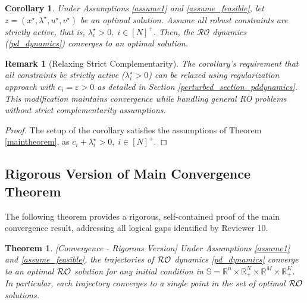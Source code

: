 \documentclass[journal,twoside,web]{ieeecolor}
\newcommand{\rev}[1]{\textcolor{revisionblue}{#1}}
\newcommand{\purpletext}[1]{\textcolor{proofpurple}{#1}}
\newtheorem{theorem}{Theorem}
\newtheorem{corollary}{Corollary}
\newtheorem{remark}{Remark}
\begin{document}
\begin{corollary}
Under Assumptions \ref{assume1} and \ref{assume_feasible}, let $z=(x^\star,\lambda^\star,u^\star,v^\star)$ be an optimal solution.
Assume all robust constraints are strictly active, that is, $\lambda_i^\star>0,\;i\in[N]^+$. Then, the $\mathcal{RO}$ dynamics (\ref{pd_dynamics}) converges to an optimal solution.
\end{corollary}

\begin{remark}[\rev{Relaxing Strict Complementarity}]
\rev{The corollary's requirement that all constraints be strictly active ($\lambda_i^\star > 0$) can be relaxed using
regularization approach with $c_i = \varepsilon > 0$ as detailed in Section \ref{perturbed_section_pddynamics}. This modification maintains convergence while handling general RO problems without strict complementarity assumptions.}
\end{remark}
\begin{proof}
The setup of the corollary satisfies the assumptions of Theorem \ref{maintheorem}, as $c_i+\lambda_i^\star>0,\;i\in[N]^+$.
\end{proof}

\newpage
\subsection*{\purpletext{Rigorous Version of Main Convergence Theorem}}

\purpletext{The following theorem provides a rigorous, self-contained proof of the main convergence result, addressing all logical gaps identified by Reviewer 10.}

\begin{theorem}\label{main_theorem_copy}[Convergence - Rigorous Version]
\rev{Under Assumptions \ref{assume1} and \ref{assume_feasible}, the trajectories of ${\cal RO}$ dynamics \eqref{pd_dynamics} converge to an optimal ${\cal RO}$ solution for any initial condition in $\mathbb{S}=\mathbb{R}^n\times \mathbb{R}^N_{+}\times \mathbb{R}^M\times \mathbb{R}^K_+$. In particular, each trajectory converges to a single point in the set of optimal ${\cal RO}$ solutions.}
\end{theorem}
\end{document}
